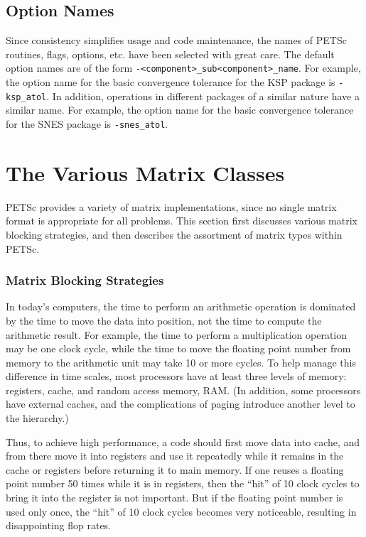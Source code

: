 \documentclass[twoside,12pt]{../sty/report_petsc}
\newcommand{\sindex}[1]{\index{#1}}
\begin{document}
\section{Option Names}

Since consistency simplifies usage and code maintenance, the names of
PETSc routines, flags, options, etc. have been selected with great care.
The default option names are of the form {\tt -<component>\_sub<component>\_name}.  
For example, the option name for the basic convergence tolerance for 
the KSP package is {\tt -ksp\_atol}. In addition, operations in different 
packages of a similar nature have a similar name.  For example, the option
name for the basic convergence tolerance for the SNES package is 
{\tt -snes\_atol}.

\chapter{The Various Matrix Classes}
\label{sec:matclasses}

PETSc provides a variety of matrix implementations, since no single
matrix format is appropriate for all problems.  This section first
discusses various matrix blocking strategies, and then 
describes the assortment of matrix types within PETSc.

\subsection{Matrix Blocking Strategies}
\sindex{matrix blocking} 
\sindex{blocking} 

In today's computers, the time to perform an arithmetic operation is
dominated by the time to move the data into position, not the time to
compute the arithmetic result.  For example, the time to perform a
multiplication operation may be one clock cycle, while the time to
move the floating point number from memory to the arithmetic unit may
take 10 or more cycles. To help manage this difference in time scales,
most processors have at least three levels of memory: registers,
cache, and random access memory, RAM. (In addition, some processors
have external caches, and the complications of paging introduce
another level to the hierarchy.)

Thus, to achieve high performance, a code should first move data into
cache, and from there move it into registers and use it repeatedly
while it remains in the cache or registers before returning it to main
memory. If one reuses a floating point number 50 times while it is in
registers, then the ``hit'' of 10 clock cycles to bring it into the
register is not important. But if the floating point number is used
only once, the ``hit'' of 10 clock cycles becomes very noticeable,
resulting in disappointing flop rates.
\end{document}
